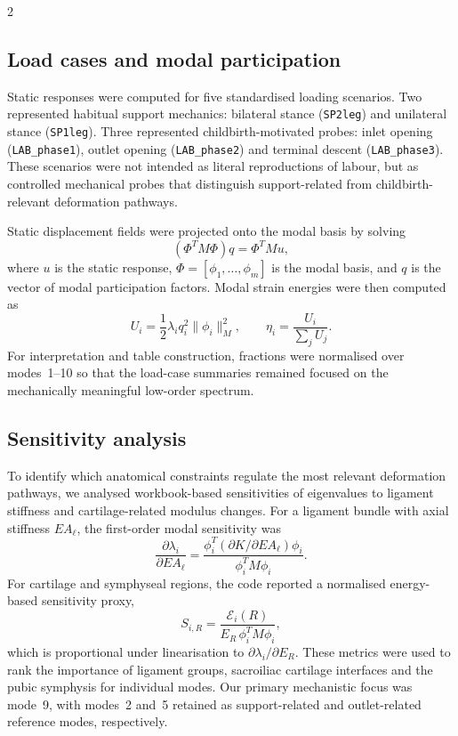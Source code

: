 \documentclass[openacc]{rsproca_new}
\begin{document}
\begin{multicols}{2}
\subsection{Load cases and modal participation}

Static responses were computed for five standardised loading scenarios. Two represented habitual support mechanics: bilateral stance (\texttt{SP2leg}) and unilateral stance (\texttt{SP1leg}). Three represented childbirth-motivated probes: inlet opening (\texttt{LAB\_phase1}), outlet opening (\texttt{LAB\_phase2}) and terminal descent (\texttt{LAB\_phase3}). These scenarios were not intended as literal reproductions of labour, but as controlled mechanical probes that distinguish support-related from childbirth-relevant deformation pathways.

Static displacement fields were projected onto the modal basis by solving
\begin{equation}
(\Phi^{T}M\Phi)q = \Phi^{T}Mu,
\end{equation}
where $u$ is the static response, $\Phi=[\phi_{1},\ldots,\phi_{m}]$ is the modal basis, and $q$ is the vector of modal participation factors. Modal strain energies were then computed as
\begin{equation}
U_{i}=\frac{1}{2}\lambda_{i}q_{i}^{2}\|\phi_{i}\|_{M}^{2}, \qquad
\eta_{i}=\frac{U_{i}}{\sum_{j}U_{j}}.
\end{equation}
For interpretation and table construction, fractions were normalised over modes~1--10 so that the load-case summaries remained focused on the mechanically meaningful low-order spectrum.

\subsection{Sensitivity analysis}

To identify which anatomical constraints regulate the most relevant deformation pathways, we analysed workbook-based sensitivities of eigenvalues to ligament stiffness and cartilage-related modulus changes. For a ligament bundle with axial stiffness $EA_{\ell}$, the first-order modal sensitivity was
\begin{equation}
\frac{\partial \lambda_{i}}{\partial EA_{\ell}}
=
\frac{\phi_{i}^{T}(\partial K/\partial EA_{\ell})\phi_{i}}
{\phi_{i}^{T}M\phi_{i}}.
\end{equation}
For cartilage and symphyseal regions, the code reported a normalised energy-based sensitivity proxy,
\begin{equation}
S_{i,R}=\frac{\mathcal{E}_{i}(R)}{E_{R}\,\phi_{i}^{T}M\phi_{i}},
\end{equation}
which is proportional under linearisation to $\partial \lambda_{i}/\partial E_{R}$. These metrics were used to rank the importance of ligament groups, sacroiliac cartilage interfaces and the pubic symphysis for individual modes. Our primary mechanistic focus was mode~9, with modes~2 and~5 retained as support-related and outlet-related reference modes, respectively.


\end{multicols}
\end{document}
